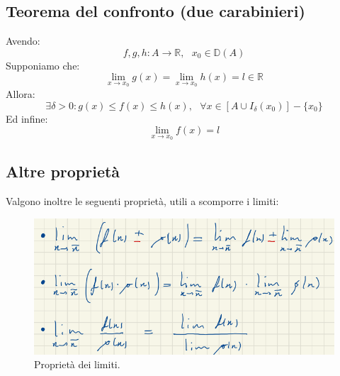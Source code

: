 \documentclass[12pt]{article}
\begin{document}
\subsection{Teorema del confronto (due carabinieri)}
Avendo:
\[
    f, g, h : A \rightarrow \mathbb{R}, \text{ } x_0 \in \mathbb{D}(A)
\]
Supponiamo che:
\begin{equation}
    \lim_{x \to x_0} g(x) = \lim_{x \to x_0} h(x) = l \in \mathbb{R} \label{teo:carabinieri_suppose}
\end{equation}
Allora:
\begin{equation}
    \exists \delta > 0: g(x) \leq f(x) \leq h(x), \text{ } \forall x \in [A \cup I_\delta(x_0)] - \{x_0\} \label{teo:carabinieri_then}
\end{equation}
Ed infine:
\begin{equation}
    \lim_{x \to x_0} f(x) = l \label{teo:carabinieri_end}
\end{equation}
\subsection{Altre proprietà}
Valgono inoltre le seguenti proprietà, utili a scomporre i limiti:
\begin{figure}[!htb]
    \centering
    \includegraphics[width=1\textwidth, height=.7\textheight,keepaspectratio]{lezione_7/prop_limiti.png}
    \begin{center}
        \caption{\label{fig:proprietà_limiti}Proprietà dei limiti.}
    \end{center}
\end{figure}
\end{document}
